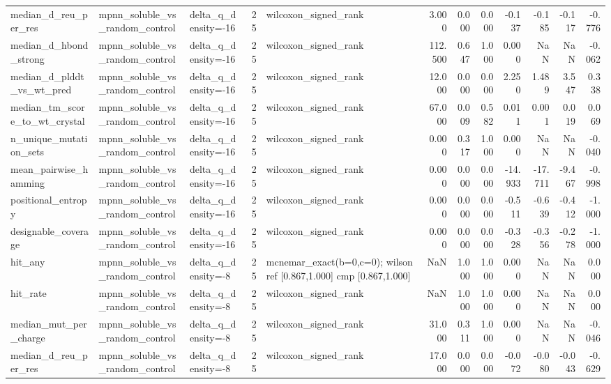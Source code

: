 \begin{table}
{\begin{tabular}{lllrlrrrrrrr}
median\_d\_reu\_per\_res & mpnn\_soluble\_vs\_random\_control & delta\_q\_density=-16 & 25 & wilcoxon\_signed\_rank & 3.000 & 0.000 & 0.000 & -0.137 & -0.185 & -0.117 & -0.776 \\
median\_d\_hbond\_strong & mpnn\_soluble\_vs\_random\_control & delta\_q\_density=-16 & 25 & wilcoxon\_signed\_rank & 112.500 & 0.647 & 1.000 & 0.000 & NaN & NaN & -0.062 \\
median\_d\_plddt\_vs\_wt\_pred & mpnn\_soluble\_vs\_random\_control & delta\_q\_density=-16 & 25 & wilcoxon\_signed\_rank & 12.000 & 0.000 & 0.000 & 2.250 & 1.489 & 3.547 & 0.338 \\
median\_tm\_score\_to\_wt\_crystal & mpnn\_soluble\_vs\_random\_control & delta\_q\_density=-16 & 25 & wilcoxon\_signed\_rank & 67.000 & 0.009 & 0.582 & 0.011 & 0.001 & 0.019 & 0.069 \\
n\_unique\_mutation\_sets & mpnn\_soluble\_vs\_random\_control & delta\_q\_density=-16 & 25 & wilcoxon\_signed\_rank & 0.000 & 0.317 & 1.000 & 0.000 & NaN & NaN & -0.040 \\
mean\_pairwise\_hamming & mpnn\_soluble\_vs\_random\_control & delta\_q\_density=-16 & 25 & wilcoxon\_signed\_rank & 0.000 & 0.000 & 0.000 & -14.933 & -17.711 & -9.467 & -0.998 \\
positional\_entropy & mpnn\_soluble\_vs\_random\_control & delta\_q\_density=-16 & 25 & wilcoxon\_signed\_rank & 0.000 & 0.000 & 0.000 & -0.511 & -0.639 & -0.412 & -1.000 \\
designable\_coverage & mpnn\_soluble\_vs\_random\_control & delta\_q\_density=-16 & 25 & wilcoxon\_signed\_rank & 0.000 & 0.000 & 0.000 & -0.328 & -0.356 & -0.278 & -1.000 \\
hit\_any & mpnn\_soluble\_vs\_random\_control & delta\_q\_density=-8 & 25 & mcnemar\_exact(b=0,c=0); wilson ref [0.867,1.000] cmp [0.867,1.000] & NaN & 1.000 & 1.000 & 0.000 & NaN & NaN & 0.000 \\
hit\_rate & mpnn\_soluble\_vs\_random\_control & delta\_q\_density=-8 & 25 & wilcoxon\_signed\_rank & NaN & 1.000 & 1.000 & 0.000 & NaN & NaN & 0.000 \\
median\_mut\_per\_charge & mpnn\_soluble\_vs\_random\_control & delta\_q\_density=-8 & 25 & wilcoxon\_signed\_rank & 31.000 & 0.311 & 1.000 & 0.000 & NaN & NaN & -0.046 \\
median\_d\_reu\_per\_res & mpnn\_soluble\_vs\_random\_control & delta\_q\_density=-8 & 25 & wilcoxon\_signed\_rank & 17.000 & 0.000 & 0.000 & -0.072 & -0.080 & -0.043 & -0.629 \\

\end{tabular}}
\end{table}
